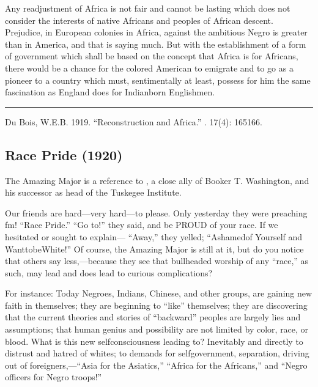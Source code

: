 \documentclass[letterpaper,10pt,english]{jupyterBook}
\begin{document}
\sphinxAtStartPar
Any readjustment of Africa is not fair and cannot be lasting which does not consider the interests of native Africans and peoples of African descent. Prejudice, in European colonies in Africa, against the ambitious Negro is greater than in America, and that is saying much. But with the establishment of a form of gov­ernment which shall be based on the concept that Africa is for Africans, there would be a chance for the colored American to emigrate and to go as a pioneer to a country which must, sentimentally at least, possess for him the same fascination as England does for Indian\sphinxhyphen{}born English­men.


\bigskip\hrule\bigskip


\sphinxAtStartPar
{} Du Bois, W.E.B. 1919. “Reconstruction and Africa.” . 17(4): 165\sphinxhyphen{}166.


\subsection{Race Pride (1920)}
\label{\detokenize{Volumes/19/03/race_pride:race-pride-1920}}\label{\detokenize{Volumes/19/03/race_pride::doc}}
\begin{sphinxShadowBox}
\sphinxstylesidebartitle{}

\sphinxAtStartPar
{}
The Amazing Major is a reference to , a close ally of Booker T. Washington, and his successor as head of the  Tuskegee Institute.
\end{sphinxShadowBox}

\sphinxAtStartPar
Our friends are hard—very hard—to please. Only yesterday they were preaching fm! “Race Pride.” “Go to!” they said, and be PROUD of your race. If we hesitated or sought to explain— “Away,” they yelled; “Ashamed\sphinxhyphen{}of Yourself and Want\sphinxhyphen{}to\sphinxhyphen{}be\sphinxhyphen{}White!” Of course, the Amazing Major is still at it, but do you notice that others say less,—because they see that bullheaded worship of any “race,” as such, may lead and does lead to curious complications?

\sphinxAtStartPar
For instance: Today Negroes, Indians, Chinese, and other groups, are gaining new faith in themselves; they are beginning to “like” themselves; they are discovering that the current theories and stories of “backward” peoples are largely lies and assumptions; that human genius and possibility are not limited by color, race, or blood. What is this new self\sphinxhyphen{}consciousness leading to? Inevitably and directly to distrust and hatred of whites; to demands for self\sphinxhyphen{}government, separation, driving out of foreigners,—“Asia for the Asiatics,” “Africa for the Africans,” and “Negro officers for Negro troops!”
\end{document}
